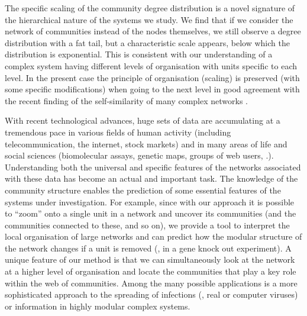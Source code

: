 \documentclass[11pt,a4paper]{article}
\begin{document}
The specific scaling of the community degree distribution 
is a novel signature of the
hierarchical nature of the systems we study. We find that if we
consider the network of communities instead of the nodes themselves, we
still observe a degree distribution with a fat tail, but a
characteristic scale appears, below which the distribution is
exponential. This is consistent with our understanding of a complex
system having different levels of organisation with units specific to
each level.
In the present case the principle of organisation
(scaling) is preserved (with some specific modifications) when going to
the next level
{\corr
in good agreement with the recent finding of the
self-similarity of many complex networks
\cite{makse-nature}.}

With recent technological advances, huge sets of data are accumulating
at a tremendous pace in various fields of human activity (including
telecommunication, the internet, stock markets) and
in many areas of life and social sciences
(biomolecular assays, genetic maps, groups of web users, \etc.).
Understanding both the universal and specific features of the networks
associated with these data has become an actual and important task.
%
The knowledge of the community structure enables
the prediction of some essential features of the systems under
investigation. For example, since with our approach it is possible to
``zoom'' onto a single unit in a network and uncover its communities
(and the communities connected to these, and so on), we provide a tool
to interpret the local organisation of large networks and can predict
how the modular structure of the network changes if a unit is removed
(\eg, in a gene knock out experiment).
%
A unique feature of our method is that we can simultaneously
look at the network at a
higher level of organisation and locate the communities that play a key
role within the web of communities. Among the many possible
applications is a more sophisticated approach to the spreading of
infections (\eg, real or computer viruses) or information
in highly modular complex systems.
\end{document}
